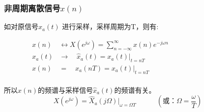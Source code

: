 \documentclass[notheorems,compress,mathserif,table]{beamer}
\begin{document}
\begin{frame}[shrink]\frametitle{非周期离散信号$x(n)$}%

        \par 如对原信号$x_a(t)$ 进行采样，采样周期为T，则有:
        \newline\newline\newline\newline\newline\newline



        \begin{equation}
        \begin{split}
             x(n) \:  &\longleftrightarrow   X(e^{j\omega}) = \sum_{n=-\infty}^{\infty}x(n)e^{-j\omega n}\quad\quad\quad\quad\quad\quad\quad\quad\\
             x_a(t)   &\longrightarrow     \quad  \hat{x}_a(t) = x_a(t)|_{t=nT}\\
             x(n)\:   &=\quad  x_a(nT)  = x_a(t)|_{t=nT}\\
        \end{split}
        \end{equation}

        所以$x(n)$的频谱与采样信号$\hat{x}_a(t)$的频谱有关。
        $$ X(e^{j\omega})  = \hat{X}_a(j\Omega)\big|_{\omega = \Omega T}\quad\quad\quad(\mbox{或：}\Omega = \frac{\omega}{T})$$%
\end{frame}
\end{document}
